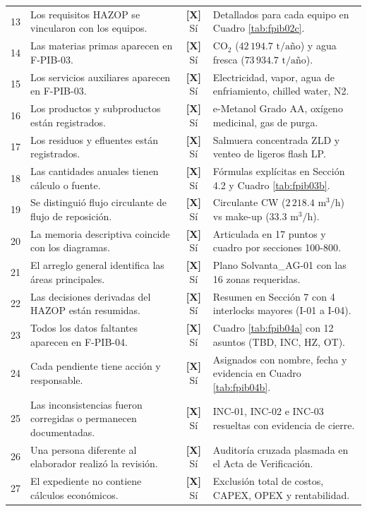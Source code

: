 \documentclass[10pt,letterpaper]{article}
\begin{document}
\begin{table}[H]
\begin{tabularx}{\textwidth}{c X c p{5.5cm}}
13 & Los requisitos HAZOP se vincularon con los equipos. & \textbf{[X]} Sí & Detallados para cada equipo en Cuadro \ref{tab:fpib02c}. \\
14 & Las materias primas aparecen en F-PIB-03. & \textbf{[X]} Sí & $\text{CO}_2$ ($42\,194.7\text{ t/año}$) y agua fresca ($73\,934.7\text{ t/año}$). \\
15 & Los servicios auxiliares aparecen en F-PIB-03. & \textbf{[X]} Sí & Electricidad, vapor, agua de enfriamiento, chilled water, N2. \\
16 & Los productos y subproductos están registrados. & \textbf{[X]} Sí & e-Metanol Grado AA, oxígeno medicinal, gas de purga. \\
17 & Los residuos y efluentes están registrados. & \textbf{[X]} Sí & Salmuera concentrada ZLD y venteo de ligeros flash LP. \\
18 & Las cantidades anuales tienen cálculo o fuente. & \textbf{[X]} Sí & Fórmulas explícitas en Sección 4.2 y Cuadro \ref{tab:fpib03b}. \\
19 & Se distinguió flujo circulante de flujo de reposición. & \textbf{[X]} Sí & Circulante CW ($2\,218.4\text{ m}^3\text{/h}$) vs make-up ($33.3\text{ m}^3\text{/h}$). \\
20 & La memoria descriptiva coincide con los diagramas. & \textbf{[X]} Sí & Articulada en 17 puntos y cuadro por secciones 100-800. \\
21 & El arreglo general identifica las áreas principales. & \textbf{[X]} Sí & Plano Solvanta\_AG-01 con las 16 zonas requeridas. \\
22 & Las decisiones derivadas del HAZOP están resumidas. & \textbf{[X]} Sí & Resumen en Sección 7 con 4 interlocks mayores (I-01 a I-04). \\
23 & Todos los datos faltantes aparecen en F-PIB-04. & \textbf{[X]} Sí & Cuadro \ref{tab:fpib04a} con 12 asuntos (TBD, INC, HZ, OT). \\
24 & Cada pendiente tiene acción y responsable. & \textbf{[X]} Sí & Asignados con nombre, fecha y evidencia en Cuadro \ref{tab:fpib04b}. \\
25 & Las inconsistencias fueron corregidas o permanecen documentadas. & \textbf{[X]} Sí & INC-01, INC-02 e INC-03 resueltas con evidencia de cierre. \\
26 & Una persona diferente al elaborador realizó la revisión. & \textbf{[X]} Sí & Auditoría cruzada plasmada en el Acta de Verificación. \\
27 & El expediente no contiene cálculos económicos. & \textbf{[X]} Sí & Exclusión total de costos, CAPEX, OPEX y rentabilidad. \\
\bottomrule
\end{tabularx}
\end{table}
\end{document}

